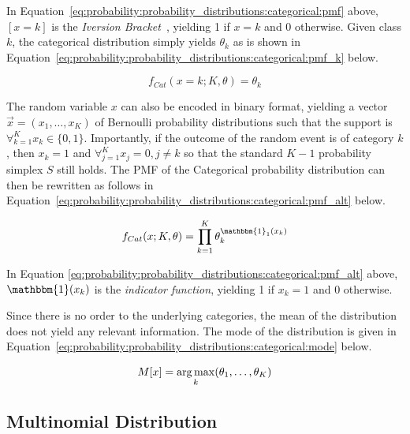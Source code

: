 In Equation~\eqref{eq:probability:probability_distributions:categorical:pmf} above, $[x = k]$ is the \textit{Iversion Bracket}~\cite{ref:iverson:1962}, yielding 1 if $x = k$ and 0 otherwise. Given class $k$, the categorical distribution simply yields $\theta_{k}$ as is shown in Equation~\eqref{eq:probability:probability_distributions:categorical:pmf_k} below.

\begin{equation}
      \label{eq:probability:probability_distributions:categorical:pmf_k}
      f_{Cat}(x=k; K, \theta) = \theta_{k}
\end{equation}

The random variable $x$ can also be encoded in binary format, yielding a vector $\vec{x} = (x_{1}, \dots, x_{K})$ of Bernoulli probability distributions such that the support is $\forall_{k=1}^{K} x_{k} \in \{0, 1\}$. Importantly, if the outcome of the random event is of category $k$, then $x_{k} = 1$ and $\forall_{j=1}^{K} x_{j} = 0, j \neq k$ so that the standard $K-1$ probability simplex $S$ still holds. The \acs{PMF} of the Categorical probability distribution can then be rewritten as follows in Equation~\eqref{eq:probability:probability_distributions:categorical:pmf_alt} below.

\begin{equation}
      \label{eq:probability:probability_distributions:categorical:pmf_alt}
      f_{Cat}(x; K, \theta) = \prod_{k=1}^{K}\theta_{k}^{\mathbbm{1}_{1}(x_{k})}
\end{equation}

In Equation \ref{eq:probability:probability_distributions:categorical:pmf_alt} above, $\mathbbm{1}(x_{k})$ is the \textit{indicator function}, yielding 1 if $x_{k} = 1$ and 0 otherwise.

Since there is no order to the underlying categories, the mean of the distribution does not yield any relevant information. The mode of the distribution is given in Equation~\eqref{eq:probability:probability_distributions:categorical:mode} below.

\begin{equation}
      \label{eq:probability:probability_distributions:categorical:mode}
      M[x] = \operatorname*{arg\,max}_{k}(\theta_{1}, \dots, \theta_{K})
\end{equation}


\subsection{Multinomial Distribution}
\label{sec:probability:probability_distributions:multinomial}

